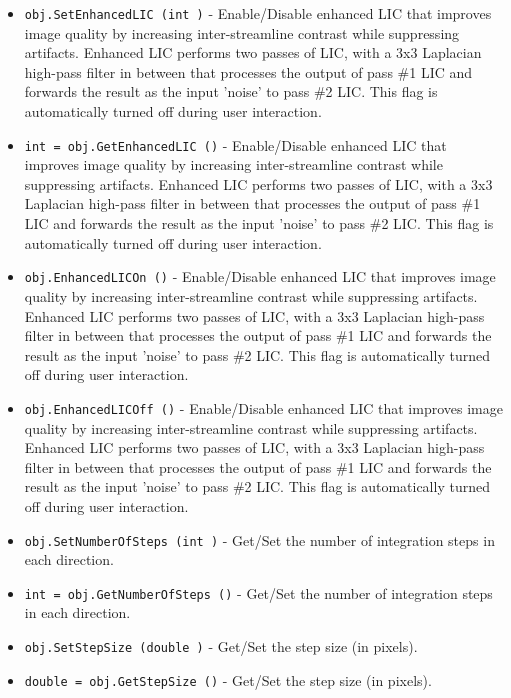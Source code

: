 \begin{itemize}
\item  \verb|obj.SetEnhancedLIC (int )| -  Enable/Disable enhanced LIC that improves image quality by increasing
 inter-streamline contrast while suppressing artifacts. Enhanced LIC
 performs two passes of LIC, with a 3x3 Laplacian high-pass filter in
 between that processes the output of pass \#1 LIC and forwards the result
 as the input 'noise' to pass \#2 LIC. This flag is automatically turned
 off during user interaction.

\item  \verb|int = obj.GetEnhancedLIC ()| -  Enable/Disable enhanced LIC that improves image quality by increasing
 inter-streamline contrast while suppressing artifacts. Enhanced LIC
 performs two passes of LIC, with a 3x3 Laplacian high-pass filter in
 between that processes the output of pass \#1 LIC and forwards the result
 as the input 'noise' to pass \#2 LIC. This flag is automatically turned
 off during user interaction.

\item  \verb|obj.EnhancedLICOn ()| -  Enable/Disable enhanced LIC that improves image quality by increasing
 inter-streamline contrast while suppressing artifacts. Enhanced LIC
 performs two passes of LIC, with a 3x3 Laplacian high-pass filter in
 between that processes the output of pass \#1 LIC and forwards the result
 as the input 'noise' to pass \#2 LIC. This flag is automatically turned
 off during user interaction.

\item  \verb|obj.EnhancedLICOff ()| -  Enable/Disable enhanced LIC that improves image quality by increasing
 inter-streamline contrast while suppressing artifacts. Enhanced LIC
 performs two passes of LIC, with a 3x3 Laplacian high-pass filter in
 between that processes the output of pass \#1 LIC and forwards the result
 as the input 'noise' to pass \#2 LIC. This flag is automatically turned
 off during user interaction.

\item  \verb|obj.SetNumberOfSteps (int )| -  Get/Set the number of integration steps in each direction.

\item  \verb|int = obj.GetNumberOfSteps ()| -  Get/Set the number of integration steps in each direction.

\item  \verb|obj.SetStepSize (double )| -  Get/Set the step size (in pixels).

\item  \verb|double = obj.GetStepSize ()| -  Get/Set the step size (in pixels).


\end{itemize}
